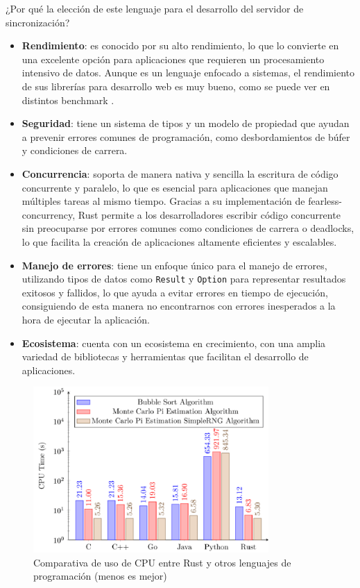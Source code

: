 ¿Por qué la elección de este lenguaje para el desarrollo del servidor de sincronización? \parencite{rust-for-safety-and-performance}
\begin{itemize}
    \item \textbf{Rendimiento}: es conocido por su alto rendimiento, lo que lo convierte en una excelente opción para aplicaciones que requieren un procesamiento intensivo de datos. Aunque es un lenguaje enfocado a sistemas, el rendimiento de sus librerías para desarrollo web es muy bueno, como se puede ver en distintos benchmark \parencite{rust-benchmark}.
    \item \textbf{Seguridad}: tiene un sistema de tipos y un modelo de propiedad que ayudan a prevenir errores comunes de programación, como desbordamientos de búfer y condiciones de carrera.
    \item \textbf{Concurrencia}: soporta de manera nativa y sencilla la escritura de código concurrente y paralelo, lo que es esencial para aplicaciones que manejan múltiples tareas al mismo tiempo.
        Gracias a su implementación de \gls{fearless-concurrency}, Rust permite a los desarrolladores escribir código concurrente sin preocuparse por errores comunes como condiciones de carrera o deadlocks, lo que facilita la creación de aplicaciones altamente eficientes y escalables.
    \item \textbf{Manejo de errores}: tiene un enfoque único para el manejo de errores, utilizando tipos de datos como \texttt{Result} y \texttt{Option} para representar resultados exitosos y fallidos, lo que ayuda a evitar errores en tiempo de ejecución, consiguiendo de esta manera no encontrarnos con errores inesperados a la hora de ejecutar la aplicación.
    \item \textbf{Ecosistema}: cuenta con un ecosistema en crecimiento, con una amplia variedad de bibliotecas y herramientas que facilitan el desarrollo de aplicaciones.
\end{itemize}


\begin{figure}[H]
  \centering
  \includegraphics[width=0.8\textwidth]{assets/rust-cpu-comparison.png}
  \caption{Comparativa de uso de CPU entre Rust y otros lenguajes de programación (menos es mejor) \parencite{rust-for-safety-and-performance}}
  \label{fig:rust-cpu-comparison}
\end{figure}


